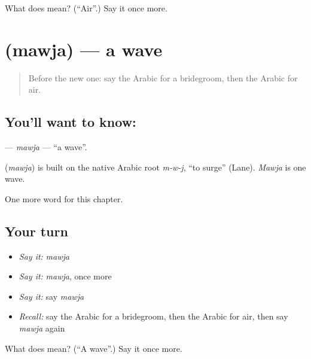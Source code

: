 \begin{tcolorbox}[breakable,colback=teal!4,colframe=teal!35!black,title={Before you move on}]
What does  mean? (\textquotedblleft{}Air\textquotedblright{}.) Say it once more.
\end{tcolorbox}
\section[\texorpdfstring{\ar{موجة} (mawja)}{موجة (mawja)}]{ (mawja) — a wave}

\label{lesson:AR-C247-mawja}



\begin{quote}
Before the new one: say the Arabic for a bridegroom, then the Arabic for air.
\end{quote}

\subsection*{You'll want to know: }
\textbf{} — \emph{mawja} — \textquotedblleft{}a wave\textquotedblright{}.

\begin{cousinweb}
\textbf{} (\emph{mawja}) is built on the native Arabic root \emph{m-w-j}, \textquotedblleft{}to surge\textquotedblright{} (Lane). \emph{Mawja} is one wave.
\end{cousinweb}

\begin{grammarlens}[title={What you've built}]
One more word for this chapter.
\end{grammarlens}

\subsection*{Your turn}
\begin{itemize}
\raggedright
  \item \emph{Say it:} \emph{mawja}
  \item \emph{Say it:} \emph{mawja}, once more
  \item \emph{Say it:} say \emph{mawja}
  \item \emph{Recall:} say the Arabic for a bridegroom, then the Arabic for air, then say \emph{mawja} again
\end{itemize}

\begin{tcolorbox}[breakable,colback=teal!4,colframe=teal!35!black,title={Before you move on}]
What does  mean? (\textquotedblleft{}A wave\textquotedblright{}.) Say it once more.
\end{tcolorbox}
